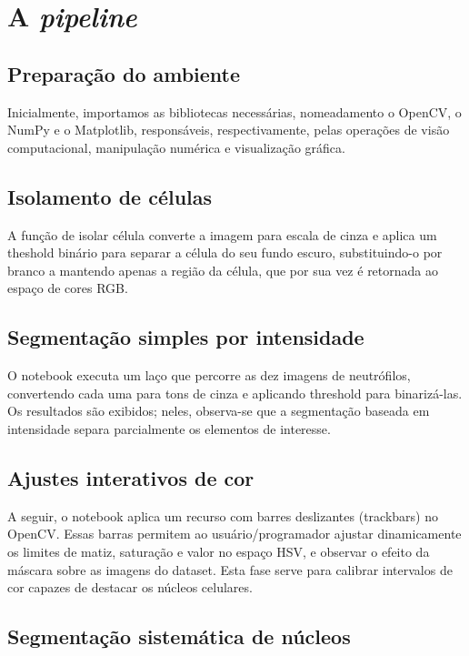 \documentclass{article}
\begin{document}
\section{A \textit{pipeline}}

\subsection{Preparação do ambiente}

Inicialmente, importamos as bibliotecas necessárias, nomeadamento o OpenCV, o NumPy e o Matplotlib, responsáveis, respectivamente, pelas operações de visão computacional, manipulação numérica e visualização gráfica.

\subsection{Isolamento de células}

A função de isolar célula converte a imagem para escala de cinza e aplica um theshold binário para separar a célula do seu fundo escuro, substituindo-o por branco a mantendo apenas a região da célula, que por sua vez é retornada ao espaço de cores RGB.

\subsection{Segmentação simples por intensidade}

O notebook executa um laço que percorre as dez imagens de neutrófilos, convertendo cada uma para tons de cinza e aplicando threshold para binarizá-las. Os resultados são exibidos; neles, observa-se que a segmentação baseada em intensidade separa parcialmente os elementos de interesse.

\subsection{Ajustes interativos de cor}

A seguir, o notebook aplica um recurso com barres deslizantes (trackbars) no OpenCV. Essas barras permitem ao usuário/programador ajustar dinamicamente os limites de matiz, saturação e valor no espaço HSV, e observar o efeito da máscara sobre as imagens do dataset. Esta fase serve para calibrar intervalos de cor capazes de destacar os núcleos celulares.

\subsection{Segmentação sistemática de núcleos}
\end{document}
